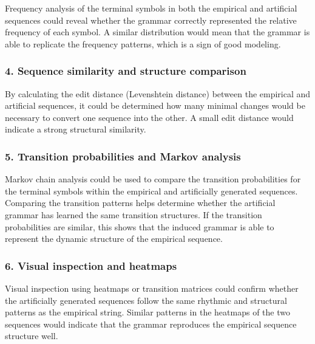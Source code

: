 \documentclass[
]{article}
\begin{document}
Frequency analysis of the terminal symbols in both the empirical and
artificial sequences could reveal whether the grammar correctly
represented the relative frequency of each symbol. A similar
distribution would mean that the grammar is able to replicate the
frequency patterns, which is a sign of good modeling.

\subsubsection{\texorpdfstring{\textbf{4. Sequence similarity and
structure
comparison}}{4. Sequence similarity and structure comparison}}\label{sequence-similarity-and-structure-comparison}

By calculating the edit distance (Levenshtein distance) between the
empirical and artificial sequences, it could be determined how many
minimal changes would be necessary to convert one sequence into the
other. A small edit distance would indicate a strong structural
similarity.

\subsubsection{\texorpdfstring{\textbf{5. Transition probabilities and
Markov
analysis}}{5. Transition probabilities and Markov analysis}}\label{transition-probabilities-and-markov-analysis}

Markov chain analysis could be used to compare the transition
probabilities for the terminal symbols within the empirical and
artificially generated sequences. Comparing the transition patterns
helps determine whether the artificial grammar has learned the same
transition structures. If the transition probabilities are similar, this
shows that the induced grammar is able to represent the dynamic
structure of the empirical sequence.

\subsubsection{\texorpdfstring{\textbf{6. Visual inspection and
heatmaps}}{6. Visual inspection and heatmaps}}\label{visual-inspection-and-heatmaps}

Visual inspection using heatmaps or transition matrices could confirm
whether the artificially generated sequences follow the same rhythmic
and structural patterns as the empirical string. Similar patterns in the
heatmaps of the two sequences would indicate that the grammar reproduces
the empirical sequence structure well.
\end{document}
